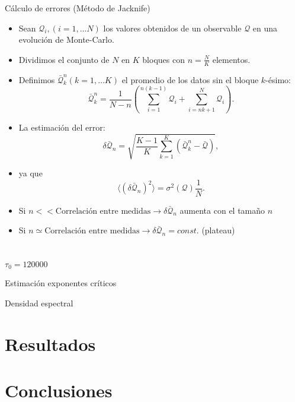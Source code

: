 \documentclass[xcolor=dvipsnames]{beamer}
\begin{document}
\begin{frame}{Cálculo de errores (Método de Jacknife)}
  \begin{itemize}
  \item Sean $\mathcal{Q}_i,(i=1,\dots N)$ los valores obtenidos de un
    observable $\mathcal{Q}$ en una evolución de Monte-Carlo. 
  \item Dividimos el conjunto de $N$ en $K$ bloques con $n=\frac{N}{K}$
    elementos.
  \item Definimos $\bar{\mathcal{Q}}_k^n(k=1,\dots K)$ el promedio de los
    datos sin el bloque $k$-ésimo:
    $$\bar{\mathcal{Q}}_k^n=\frac{1}{N-n}\left(\sum^{n(k-1)}_{i=1}\mathcal{Q}_i+\sum^{N}_{i=nk+1}\mathcal{Q}_i\right).$$
\item La estimación del error:
$$\delta\bar{\mathcal{Q}}_n=\sqrt{\frac{K-1}{K}\sum^K_{k=1}(\bar{\mathcal{Q}}^n_k-\bar{\mathcal{Q}})},$$
\item ya que
  $$ \langle (\delta\bar{\mathcal{Q}}_n)^2\rangle=\sigma^2(\mathcal{Q})\frac{1}{N}.$$
\end{itemize}
\end{frame}

\begin{frame}
\begin{itemize}
\item Si $n<<\text{Correlación entre medidas}\rightarrow
  \delta\bar{\mathcal{Q}}_n$ aumenta con el tamaño $n$
\item Si $n\simeq \text{Correlación entre
    medidas}\rightarrow\delta\bar{\mathcal{Q}}_n=const.$ (plateau)
\end{itemize}
\begin{columns}
  \begin{column}{6cm}
    \begin{figure}
      \resizebox{\columnwidth}{!}{}
    \end{figure}
  \end{column}
  \begin{column}{6cm}
     \begin{figure}
       \resizebox{\columnwidth}{!}{}
    \end{figure}
  \end{column}
\end{columns}
\begin{center}
$\tau_0=120000$
\end{center}
\end{frame}

\begin{frame}{Estimación exponentes críticos}
\end{frame}
\begin{frame}{Densidad espectral}
\end{frame}
\section{Resultados}
\begin{frame}{}
\end{frame}
\section{Conclusiones}
\begin{frame}
\end{frame}
\end{document}
